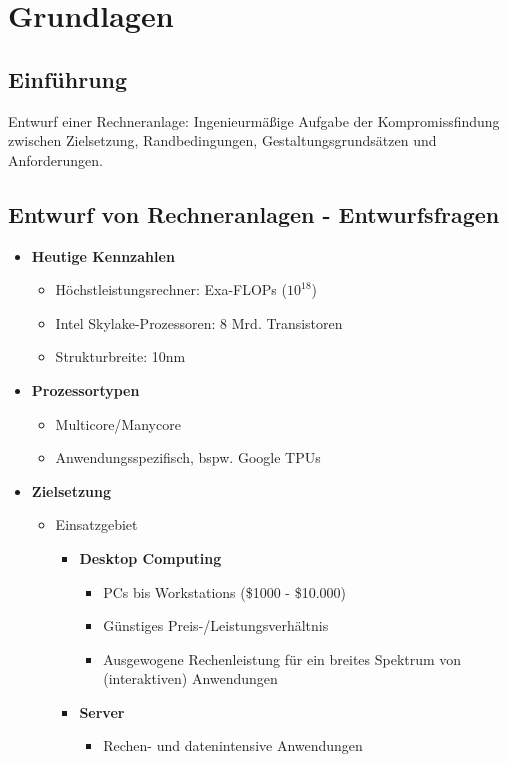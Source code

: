 \chapter{Grundlagen}

\section{Einführung}
Entwurf einer Rechneranlage: Ingenieurmäßige Aufgabe der Kompromissfindung zwischen Zielsetzung, Randbedingungen, Gestaltungsgrundsätzen und Anforderungen.


\section{Entwurf von Rechneranlagen - Entwurfsfragen}

\begin{itemize}
	\item \textbf{Heutige Kennzahlen}
	\begin{itemize}
		\item Höchstleistungsrechner: Exa-FLOPs ($10^{18}$)
		\item Intel Skylake-Prozessoren: 8 Mrd. Transistoren
		\item Strukturbreite: 10nm 
	\end{itemize}
	\item \textbf{Prozessortypen}
	\begin{itemize}
		\item Multicore/Manycore
		\item Anwendungsspezifisch, bspw. Google TPUs 
	\end{itemize}
	\item \textbf{Zielsetzung}
	\begin{itemize}
		\item Einsatzgebiet
		\begin{itemize}
			\item \textbf{Desktop Computing}
			\begin{itemize}
				\item PCs bis Workstations (\$1000 - \$10.000)
				\item Günstiges Preis-/Leistungsverhältnis
				\item Ausgewogene Rechenleistung für ein breites Spektrum von (interaktiven) Anwendungen
			\end{itemize}
			\item \textbf{Server}
			\begin{itemize}
				\item Rechen- und datenintensive Anwendungen

\end{itemize}
\end{itemize}
\end{itemize}
\end{itemize}

